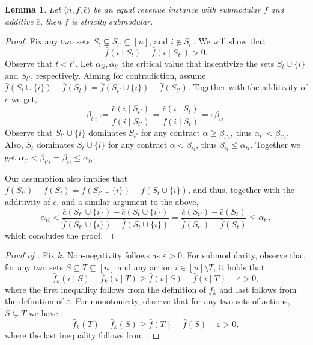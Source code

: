 \documentclass[11pt]{article}
\newtheorem{lemma}{Lemma}
\newcommand{\eps}{\varepsilon}
\newcommand{\feq}{\bar{f}}
\newcommand{\ceq}{\bar{c}}
\newcommand{\eqRevInst}{\langle n,\feq,\ceq \rangle}
\begin{document}
\begin{lemma}\label{lem:f_strictly_submodolar}
    Let $\eqRevInst$ be an equal revenue instance with submodular $\feq$ and additive $\ceq$, then $\feq$ is strictly submodular.
\end{lemma}
\begin{proof}
\newcommand{\ST}{S_t}
\newcommand{\STP}{S_{t'}}
\newcommand{\Sti}{S_t \cup \{i\}}
\newcommand{\Stpi}{S_{t'} \cup \{i\}}
Fix any two sets $\ST \subsetneq \STP \subseteq [n]$, and $i \notin \STP$. We will show that
$$
\feq(i \mid \ST) - \feq(i \mid \STP) > 0.
$$
Observe that $t < t'$. 
Let $\alpha_{ti}, \alpha_{t'}$ the critical value that incentivize the sets $\Sti$ and $S_{t'}$, respectively.
Aiming for contradiction, assume $\feq(\Sti) - \feq(\ST) = \feq(\Stpi) - \feq(\STP)$. Together with the additivity of $\ceq$ we get,
$$
\beta_{t'i} := \frac{\ceq(i \mid S_{t'})}{\feq(i \mid S_{t'})} =
\frac{\ceq(i \mid S_t)}{\feq(i \mid S_t)} =:\beta_{ti}.
$$
Observe that $\Stpi$ dominates $\STP$ for any contract $\alpha \ge \beta_{t'i}$, thus $\alpha_{t'} < \beta_{t'i}$. 
Also, $\ST$ dominates $\Sti$ for any contract $\alpha < \beta_{ti}$, thus $ \beta_{ti} \le \alpha_{ti}$. Together we get $\alpha_{t'} < \beta_{t'i} = \beta_{ti} \le \alpha_{ti}$.

Our assumption also implies that
$\feq(\STP) - \feq(\ST) = \feq(\Stpi) - \feq(\Sti)$, and thus, together with the additivity of $\ceq$, and a similar argument to the above,
\[
 \alpha_{ti} < \frac{\ceq(\Stpi) - \ceq(\Sti)}{ \feq(\Stpi) - \feq(\Sti)} =\frac{\ceq(\STP) - \ceq(\ST)}{\feq(\STP) - \feq(\ST)} \le \alpha_{t'},
\]
which concludes the proof.
\end{proof}

\begin{proof}[Proof of ]
    Fix $k$. Non-negativity follows as $\eps >0$. For submodularity, observe that for any two sets $S \subseteq T \subseteq [n]$ and any action $ i \in [n]\setminus T$, it holds that
    $$
    \feq_k(i \mid S) - \feq_k(i \mid T) \ge \feq(i \mid S) - \feq(i \mid T) - \eps > 0,$$
    where the first inequality follows from the definition of $\feq_k$ and last  follows from the definition of $\eps$.
    For monotonicity, observe that for any two sets of actions, $S \subsetneq T$ we have
    $$\feq_k(T) - \feq_k(S) \ge \feq(T) - \feq(S) - \eps > 0,$$
    where the last inequality follows from .
\end{proof}
\end{document}
